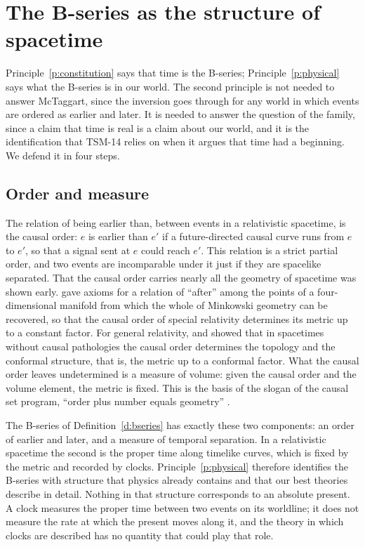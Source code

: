 \documentclass{situationist-preprint}
\begin{document}
\section{The B-series as the structure of spacetime}\label{s:spacetime}

Principle~\ref{p:constitution} says that time is the B-series; Principle~\ref{p:physical} says what the B-series is in our world. The second principle is not needed to answer McTaggart, since the inversion goes through for any world in which events are ordered as earlier and later. It is needed to answer the question of the family, since a claim that time is real is a claim about our world, and it is the identification that TSM-14 relies on when it argues that time had a beginning. We defend it in four steps.

\subsection{Order and measure}

The relation of being earlier than, between events in a relativistic spacetime, is the causal order: $e$ is earlier than $e'$ if a future-directed causal curve runs from $e$ to $e'$, so that a signal sent at $e$ could reach $e'$. This relation is a strict partial order, and two events are incomparable under it just if they are spacelike separated. That the causal order carries nearly all the geometry of spacetime was shown early. \citet{Robb1914} gave axioms for a relation of \enquote{after} among the points of a four-dimensional manifold from which the whole of Minkowski geometry can be recovered, so that the causal order of special relativity determines its metric up to a constant factor. For general relativity, \citet{HawkingKingMcCarthy1976} and \citet{Malament1977} showed that in spacetimes without causal pathologies the causal order determines the topology and the conformal structure, that is, the metric up to a conformal factor. What the causal order leaves undetermined is a measure of volume: given the causal order and the volume element, the metric is fixed. This is the basis of the slogan of the causal set program, \enquote{order plus number equals geometry} \citep{Bombelli1987}.

The B-series of Definition~\ref{d:bseries} has exactly these two components: an order of earlier and later, and a measure of temporal separation. In a relativistic spacetime the second is the proper time along timelike curves, which is fixed by the metric and recorded by clocks. Principle~\ref{p:physical} therefore identifies the B-series with structure that physics already contains and that our best theories describe in detail. Nothing in that structure corresponds to an absolute present. A clock measures the proper time between two events on its worldline; it does not measure the rate at which the present moves along it, and the theory in which clocks are described has no quantity that could play that role.
\end{document}
